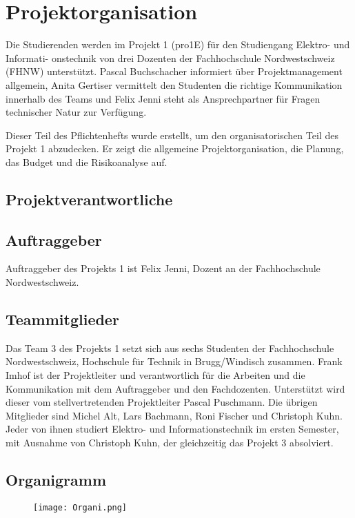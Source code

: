 \section{Projektorganisation}

Die Studierenden werden im Projekt 1 (pro1E) für den Studiengang Elektro- und Informati- onstechnik von drei Dozenten der Fachhochschule Nordwestschweiz (FHNW) unterstützt. Pascal Buchschacher informiert über Projektmanagement allgemein, Anita Gertiser vermittelt den Studenten die richtige Kommunikation innerhalb des Teams und Felix Jenni steht als Ansprechpartner für Fragen technischer Natur zur Verfügung.

Dieser Teil des Pflichtenhefts wurde erstellt, um den organisatorischen Teil des Projekt 1 abzudecken. Er zeigt die allgemeine Projektorganisation, die Planung, das Budget und die Risikoanalyse auf.
\subsection{Projektverantwortliche}

\subsection{Auftraggeber}
Auftraggeber des Projekts 1 ist Felix Jenni, Dozent an der Fachhochschule Nordwestschweiz.

\subsection{Teammitglieder}
Das Team 3 des Projekts 1 setzt sich aus sechs Studenten der Fachhochschule Nordwestschweiz, Hochschule für Technik in Brugg/Windisch zusammen. Frank Imhof ist der Projektleiter und verantwortlich für die Arbeiten und die Kommunikation mit dem Auftraggeber und den Fachdozenten. Unterstützt wird dieser vom stellvertretenden Projektleiter Pascal Puschmann. Die übrigen Mitglieder sind Michel Alt, Lars Bachmann, Roni Fischer und Christoph Kuhn. Jeder von ihnen studiert Elektro- und Informationstechnik im ersten Semester, mit Ausnahme von Christoph Kuhn, der gleichzeitig das Projekt 3 absolviert.

\subsection{Organigramm}
\begin{figure}[H]
	\centering
	\texttt{[image: Organi.png]}
	\label{fig:Organigramm}
\end{figure}

